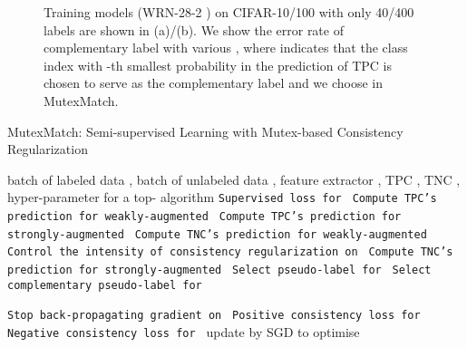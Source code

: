\documentclass[lettersize,journal]{IEEEtran}
\theoremstyle{plain}
\theoremstyle{definition}
\theoremstyle{remark}
\begin{document}
\begin{figure}[t]
\vskip 0in
\centering
{}
\hfil
\caption{Training models (WRN-28-2 \cite{zagoruyko2016wide}) on CIFAR-10/100 with only 40/400 labels are shown in (a)/(b). We show the error rate of complementary label with various , where  indicates that the class index with -th smallest probability in the prediction of TPC is chosen to serve as the complementary label and we choose  in MutexMatch.} 
   \label{fig:arg}
\end{figure}   
 \begin{algorithm*}[t]
      \caption{MutexMatch: Semi-supervised Learning with Mutex-based Consistency Regularization} 
      \label{alg}
    \begin{algorithmic}
          batch of labeled data , batch of unlabeled data , feature extractor , TPC , TNC , hyper-parameter  for a top- algorithm
            \STATE \hfill\quad\textcolor{light-gray}{ \texttt{Supervised loss for }}
                 \STATE \hfill\quad\textcolor{light-gray}{ \texttt{Compute TPC's prediction for weakly-augmented }}
                 \STATE \hfill\quad\textcolor{light-gray}{ \texttt{Compute TPC's prediction for strongly-augmented }}
                 \STATE \hfill\quad\textcolor{light-gray}{ \texttt{Compute TNC's prediction for weakly-augmented  }}
                 \STATE \hfill\quad\textcolor{light-gray}{ \texttt{Control the intensity of consistency regularization on }}
                 \STATE \hfill\quad\textcolor{light-gray}{ \texttt{Compute TNC's prediction for strongly-augmented }}
                 \STATE \hfill\quad\textcolor{light-gray}{ \texttt{Select pseudo-label for }}
                 \STATE \hfill\quad\textcolor{light-gray}{ \texttt{Select complementary pseudo-label for }}
             \ENDFOR
             
         \ENDFOR
         \STATE \hfill\quad\textcolor{light-gray}{ \texttt{Stop back-propagating gradient on }}
         \STATE \hfill\quad\textcolor{light-gray}{ \texttt{Positive consistency loss for }}
         \STATE \hfill\quad\textcolor{light-gray}{ \texttt{Negative consistency loss for }}
         \STATE  update  by SGD to optimise 
    \end{algorithmic}
  \end{algorithm*}
\end{document}

